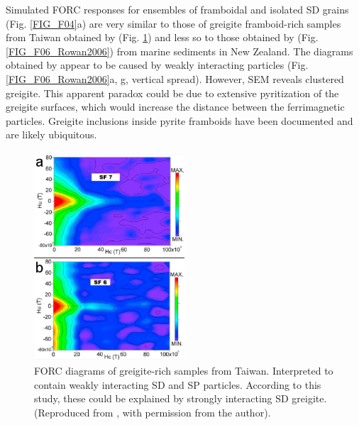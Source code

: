 Simulated FORC responses for ensembles of framboidal and isolated SD grains (Fig. \ref{FIG_F04}a) are very similar to those of greigite framboid-rich samples from Taiwan obtained by \citet{Chou2012} (Fig. \ref{FIG_F06_Chou2012}) and less so to those obtained by \citet{Rowan2006} (Fig. \ref{FIG_F06_Rowan2006}) from marine sediments in New Zealand. The diagrams obtained by \citet{Rowan2006} appear to be caused by weakly interacting particles (Fig. \ref{FIG_F06_Rowan2006}a, g, vertical spread). However, SEM reveals clustered greigite. This apparent paradox could be due to extensive pyritization of the greigite surfaces, which would increase the distance between the ferrimagnetic particles. Greigite inclusions inside pyrite framboids have been documented \citep{Ebert2018} and are likely ubiquitous.
\begin{figure}
\centering
\includegraphics[width=0.5\textwidth]{research-4/figs/Chou2012.pdf}
\caption[FORC diagram of greigite-rich samples from Taiwan]{FORC diagrams of greigite-rich samples from Taiwan. Interpreted to contain weakly interacting SD and SP particles. According to this study, these could be explained by strongly interacting SD greigite. (Reproduced from \citet{Chou2012}, with permission from the author).}
\label{FIG_F06_Chou2012}
\end{figure}

